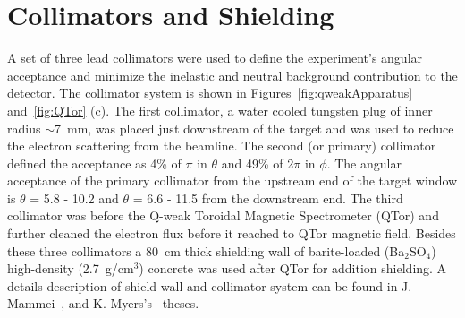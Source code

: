 \section{Collimators and Shielding }%
\label{Collimator and Shielding}

A set of three lead collimators were used to define the experiment's angular acceptance and minimize the inelastic and neutral background contribution to the detector. The collimator system is shown in Figures~\ref{fig:qweakApparatus} and~\ref{fig:QTor} (c). The first collimator, a water cooled tungsten plug of inner radius $\sim$7~mm, was placed just downstream of the target and was used to reduce the electron scattering from the beamline. The second (or primary) collimator defined the acceptance as 4\% of $\pi$ in $\theta$ and  49\% of 2$\pi$ in $\phi$. The angular acceptance of the primary collimator from the upstream end of the target window is $\theta$ = 5.8\degrees{} - 10.2\degrees{} and $\theta$ = 6.6\degrees{} - 11.5\degrees{} from the downstream end. The third collimator was before the Q-weak Toroidal Magnetic Spectrometer (QTor) and further cleaned the electron flux before it reached to QTor magnetic field. Besides these three collimators a 80~cm thick shielding wall of barite-loaded (Ba$_{2}$SO$_{4}$) high-density (2.7~g/cm$^{3}$) concrete was used after QTor for addition shielding. A details description of shield wall and collimator system can be found in J. Mammei~\cite{juliette_G0_thesis}, and K. Myers's~\cite{kmyers_qweak} theses.


